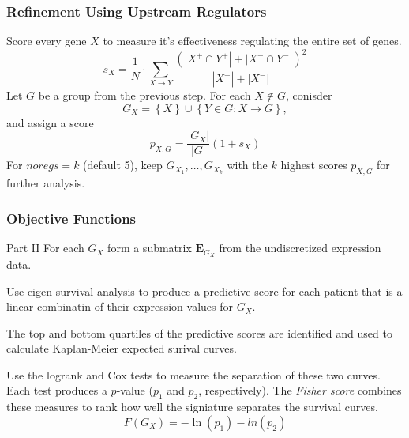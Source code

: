 \documentclass[
	11pt, %
]{beamer}
\begin{document}
\begin{frame}
    \frametitle{Refinement Using Upstream Regulators}
    Score every gene $X$ to measure it's effectiveness regulating the entire set of genes.
    \begin{equation*}
        s_X = \frac{1}{N} \cdot \sum_{X \rightarrow Y}\frac{\left( \left| X^{+} \cap Y^{+}\right| + \left| X^{-} \cap Y^{-}\right| \right)^2}{\left| X^{+} \right| + \left| X^{-} \right|}
    \end{equation*}
    \pause
    Let $G$ be a group from the previous step. For each $X \notin G$, conisder
    \begin{equation*}
        G_X = \left\{ X \right\} \cup \left\{ Y \in G : X \rightarrow G \right\},
    \end{equation*}
    \pause
    and assign a score
    \begin{equation*}
        p_{X,G}=\frac{\left| G_X \right|}{\left| G \right|}(1+s_X)
    \end{equation*}
    \pause
    For $noregs=k$ (default 5), keep $G_{X_1}, \ldots, G_{X_k}$ with the $k$ highest scores $p_{X,G}$ for further analysis.
\end{frame}


\begin{frame}
    \frametitle{Objective Functions}
    \begin{block}{Part II}
        For each $G_X$ form a submatrix $\mathbf{E}_{G_X}$ from the undiscretized expression data.
        \smallskip
        \pause

        Use eigen-survival analysis to produce a predictive score for each patient that is a linear combinatin of their expression values for $G_X$.
        \smallskip
        \pause

        The top and bottom quartiles of the predictive scores are identified and used to calculate Kaplan-Meier expected surival curves.
        \smallskip
        \pause

        Use the logrank and Cox tests to measure the separation of these two curves. Each test produces a $p$-value ($p_1$ and $p_2$, respectively). The \emph{Fisher score} combines these measures to rank how well the signiature separates the survival curves.
        \begin{equation*}
            F(G_X) = -\ln(p_1)-ln(p_2)
        \end{equation*}
    \end{block}
\end{frame}
\end{document}
